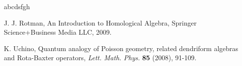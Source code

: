 \documentclass[12pt]{amsart}
\theoremstyle{definition}
\begin{document}
\begin{thebibliography}{abcdsfgh}

 J. J. Rotman, An Introduction to Homological Algebra, Springer Science+Business Media LLC, 2009.



 K. Uchino, Quantum analogy of Poisson geometry, related dendriform algebras and Rota-Baxter operators, {\em Lett. Math. Phys.} {\bf 85} (2008), 91-109.


\end{thebibliography}
\end{document}
